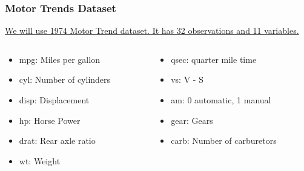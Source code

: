 \documentclass{beamer}\usepackage[]{graphicx}\usepackage[]{color}
\begin{document}
\begin{frame}
\frametitle{Motor Trends Dataset}

\href{http://www.jstor.org/stable/2530428}{We will use 1974 Motor Trend dataset. It has 32 observations and 11 variables.} \vfill

\begin{columns}[T]
	\begin{column}{.5\textwidth}
		\begin{itemize}
			\item mpg: Miles per gallon
			\item cyl: Number of cylinders
			\item disp: Displacement
			\item hp: Horse Power
			\item drat: Rear axle ratio
			\item wt: Weight
		\end{itemize}
	\end{column}

	\begin{column}{.5\textwidth}
		\begin{itemize}
			\item qsec: quarter mile time
			\item vs: V - S 
			\item am: 0 automatic, 1 manual
			\item gear: Gears
			\item carb: Number of carburetors
		\end{itemize}
	\end{column}
\end{columns}
\vfill

\end{frame}
\end{document}
